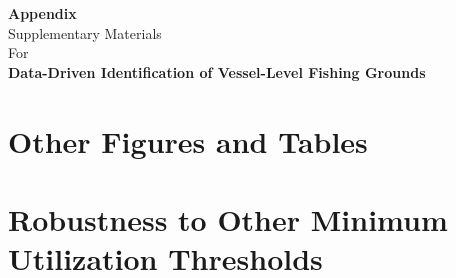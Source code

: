 \documentclass[12pt]{article}
\begin{document}
\appendix

\renewcommand\thefigure{\thesection\arabic{figure}}
\renewcommand\thetable{\thesection\arabic{table}}
\clearpage
\thispagestyle{empty}
\begin{center}
\vspace*{5cm}
{\LARGE \textbf{Appendix}}\\[2cm]
{\large Supplementary Materials}\\[0.5cm]
{\large For}\\[0.5cm]
{\large \textbf{Data-Driven Identification of Vessel-Level Fishing Grounds}}
\end{center}
\clearpage

\section{Other Figures and Tables}

\section{Robustness to Other Minimum Utilization Thresholds}\label{sec:robustness}
\end{document}
